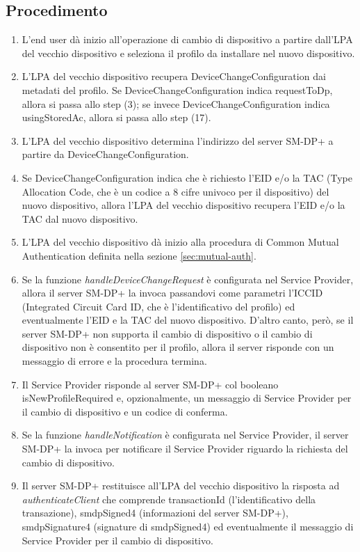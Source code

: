 \documentclass[10pt, twoside, openany]{book}
\begin{document}
\subsection{Procedimento}
\begin{enumerate}
\item L'end user dà inizio all'operazione di cambio di dispositivo a partire dall'LPA del vecchio dispositivo e seleziona il profilo da installare nel nuovo dispositivo.
\item L'LPA del vecchio dispositivo recupera DeviceChangeConfiguration dai metadati del profilo. Se DeviceChangeConfiguration indica requestToDp, allora si passa allo step (3); se invece DeviceChangeConfiguration indica usingStoredAc, allora si passa allo step (17).
\item L'LPA del vecchio dispositivo determina l'indirizzo del server SM-DP+ a partire da DeviceChangeConfiguration.
\item Se DeviceChangeConfiguration indica che è richiesto l'EID e/o la TAC (Type Allocation Code, che è un codice a 8 cifre univoco per il dispositivo) del nuovo dispositivo, allora l'LPA del vecchio dispositivo recupera l'EID e/o la TAC dal nuovo dispositivo.
\item L'LPA del vecchio dispositivo dà inizio alla procedura di Common Mutual Authentication definita nella sezione \ref{sec:mutual-auth}.
\item Se la funzione \textit{handleDeviceChangeRequest} è configurata nel Service Provider, allora il server SM-DP+ la invoca passandovi come parametri l'ICCID (Integrated Circuit Card ID, che è l'identificativo del profilo) ed eventualmente l'EID e la TAC del nuovo dispositivo. D'altro canto, però, se il server SM-DP+ non supporta il cambio di dispositivo o il cambio di dispositivo non è consentito per il profilo, allora il server risponde con un messaggio di errore e la procedura termina.
\item Il Service Provider risponde al server SM-DP+ col booleano isNewProfileRequired e, opzionalmente, un messaggio di Service Provider per il cambio di dispositivo e un codice di conferma.
\item Se la funzione \textit{handleNotification} è configurata nel Service Provider, il server SM-DP+ la invoca per notificare il Service Provider riguardo la richiesta del cambio di dispositivo.
\item Il server SM-DP+ restituisce all'LPA del vecchio dispositivo la risposta ad \textit{authenticateClient} che comprende transactionId (l'identificativo della transazione), smdpSigned4 (informazioni del server SM-DP+), smdpSignature4 (signature di smdpSigned4) ed eventualmente il messaggio di Service Provider per il cambio di dispositivo.

\end{enumerate}
\end{document}
